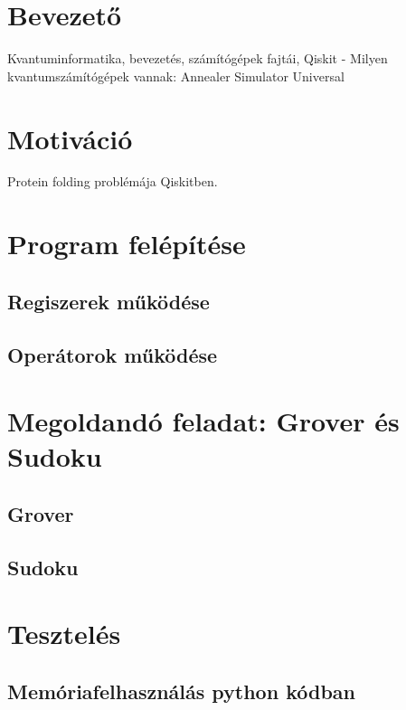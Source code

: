 \documentclass[11pt,a4paper,oneside]{report}
\begin{document}
\selectthesislanguage

\tableofcontents\vfill





\chapter{Bevezető}

Kvantuminformatika, bevezetés, számítógépek fajtái, Qiskit
- Milyen kvantumszámítógépek vannak:
  Annealer
  Simulator
  Universal
  
\chapter{Motiváció}

Protein folding problémája Qiskitben.


\chapter{Program felépítése}

\section{Regiszerek működése}

\section{Operátorok működése}

\chapter{Megoldandó feladat: Grover és Sudoku}

\section{Grover}

\section{Sudoku}

\chapter{Tesztelés}
\section{Memóriafelhasználás python kódban}
\end{document}
